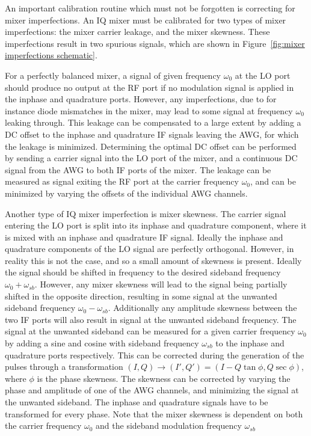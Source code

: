         An important calibration routine which must not be forgotten is correcting for mixer imperfections. An IQ mixer must be calibrated for two types of mixer imperfections: the mixer carrier leakage, and the mixer skewness. These imperfections result in two spurious signals, which are shown in Figure~\ref{fig:mixer imperfections schematic}.

        For a perfectly balanced mixer, a signal of given frequency $\omega_0$ at the LO port should produce no output at the RF port if no modulation signal is applied in the inphase and quadrature ports.  However, any imperfections, due to for instance diode mismatches in the mixer, may lead to some signal at frequency $\omega_0$ leaking through. This leakage can be compensated to a large extent by adding a DC offset to the inphase and quadrature IF signals leaving the AWG, for which the leakage is minimized. Determining the optimal DC offset can be performed by sending a carrier signal into the LO port of the mixer, and a continuous DC signal from the AWG to both IF ports of the mixer. The leakage can be measured as signal exiting the RF port at the carrier frequency $\omega_0$, and can be minimized by varying the offsets of the individual AWG channels.

        Another type of IQ mixer imperfection is mixer skewness. The carrier signal entering the LO port is split into its inphase and quadrature component, where it is mixed with an inphase and quadrature IF signal. Ideally the inphase and quadrature components of the LO signal are perfectly orthogonal. However, in reality this is not the case, and so a small amount of skewness is present. Ideally the signal should be shifted in frequency to the desired sideband frequency $\omega_0 + \omega_{sb}$. However, any mixer skewness will lead to the signal being partially shifted in the opposite direction, resulting in some signal at the unwanted sideband frequency $\omega_0 - \omega_{sb}$. Additionally any amplitude skewness between the two IF ports will also result in signal at the unwanted sideband frequency. The signal at the unwanted sideband can be measured for a given carrier frequency $\omega_0$ by adding a sine and cosine with sideband frequency $\omega_{sb}$ to the inphase and quadrature ports respectively.   This can be corrected during the generation of the pulses through a transformation $\left( I, Q \right) \rightarrow \left( I', Q' \right) = \left( I - Q \tan{\phi}, Q \sec{\phi} \right)$, where $\phi$ is the phase skewness. The skewness can be corrected by varying the phase and amplitude of one of the AWG channels, and minimizing the signal at the unwanted sideband. The inphase and quadrature signals have to be transformed for every phase. Note that the mixer skewness is dependent on both the carrier frequency $\omega_0$ and the sideband modulation frequency $\omega_{sb}$

